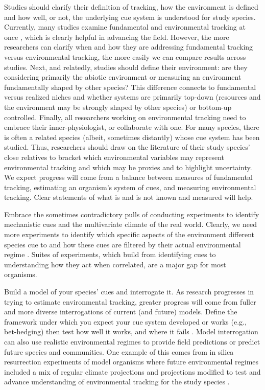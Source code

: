 \documentclass[11pt,letterpaper]{article}
\newcommand{\R}[1]{\label{#1}\linelabel{#1}}
\begin{document}
Studies should clarify their definition of tracking, how the environment is defined and how well, or not, the underlying cue system is understood for study species. Currently, many studies examine fundamental and environmental tracking at once \citep[e.g.,][]{yang2020},\R{yang2020} which is clearly helpful in advancing the field. However, the more researchers can clarify when and how they are addressing fundamental tracking versus environmental tracking, the more easily we can compare results across studies. Next, and relatedly, studies should define their environment: are they considering primarily the abiotic environment or measuring an environment fundamentally shaped by other species? This difference connects to fundamental versus realized niches and whether systems are primarily top-down (resources and the environment may be strongly shaped by other species) or bottom-up controlled. Finally, all researchers working on environmental tracking need to embrace their inner-physiologist, or collaborate with one. For many species, there is often a related species (albeit, sometimes distantly) whose cue system has been studied. Thus, researchers should draw on the literature of their study species' close relatives to bracket which environmental variables may represent environmental tracking and which may be proxies and to highlight uncertainty. We expect progress will come from a balance between measures of fundamental tracking, estimating an organism's system of cues, and measuring environmental tracking. Clear statements of what is and is not known and measured will help. 

Embrace the sometimes contradictory pulls of conducting experiments to identify mechanistic cues and the multivariate climate of the real world. Clearly, we need more experiments to identify which specific aspects of the environment different species cue to and how these cues are filtered by their actual environmental regime \citep[as outlined above and see][]{chmura2019}. Suites of experiments, which build from identifying cues to understanding how they act when correlated, are a major gap for most organisms. \R{understandquoteend}

Build a model of your species' cues and interrogate it. As research progresses in trying to estimate environmental tracking, greater progress will come from fuller and more diverse interrogations of current (and future) models. Define the framework under which you expect your cue system developed or works (e.g., bet-hedging) then test how well it works, and where it fails \citep[see][for an example]{johanOCR}. Model interrogation can also use realistic environmental regimes to provide field predictions \citep{Wilczek:2010ad,Wilczek:2009oa} or predict future species and communities. One example of this comes from in silica resurrection experiments of model organisms where future environmental regimes included a mix of regular climate projections and projections modified to test and advance understanding of environmental tracking for the study species \citep[e.g., warmer winter and altered photoperiod scenarios in][]{fournier2016}.\\
\end{document}
